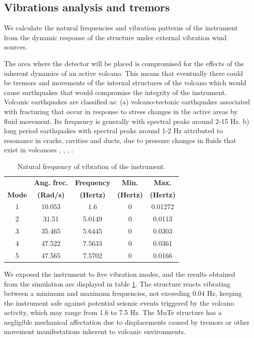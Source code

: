 \documentclass[letterpaper,11pt]{article}
\begin{document}
\subsection{Vibrations analysis and tremors}
We calculate the natural frequencies and vibration patterns of the instrument from the dynamic response of the structure under external vibration wind sources. 

The area where the detector will be placed is compromised for the effects of the inherent dynamics of an active volcano. This means that eventually there could be tremors and movements of the internal structures of the volcano which would cause earthquakes that would compromise the integrity of the instrument. Volcanic earthquakes are classified as: (a) volcano-tectonic earthquakes associated with fracturing that occur in response to stress changes in the active areas by fluid movement. Its frequency is generally with spectral peaks around 2-15 Hz. b) long period earthquakes with spectral peaks around 1-2 Hz attributed to resonance in cracks, cavities and ducts, due to pressure changes in fluids that exist in volcanoes \cite{mcnutt1992volcanic}, \cite{londono2001spectral}, \cite{langer2006automatic}, \cite{chouet2003volcano}.

\begin{table}[htb]
\begin{center}
\begin{tabular}{ccccc}
\hline
& {\bf Ang. frec.} & {\bf Frequency} & {\bf Min.}  & {\bf Max.}\\
{\bf Mode} & {\bf (Rad/s)} & {\bf (Hertz)} & {\bf (Hertz)} & {\bf (Hertz)} \\
\hline
1 & 10.053 & 1.6 & 0 & 0.01272\\ 
2 & 31.51 & 5.0149  & 0 & 0.0113 \\
3 & 35.465 & 5.6445  & 0 & 0.0303 \\
4 & 47.522 & 7.5633  & 0 & 0.0361 \\
5 & 47.565 & 7.5702 & 0 & 0.0166 \\
\hline
\end{tabular}
\end{center}
\caption{Natural frequency of vibration of the instrument.}
\label{Table_nat_frec1}
\end{table}

We exposed the instrument to five vibration modes, and the results obtained from the simulation are displayed in table \ref{Table_nat_frec1}. The structure reacts vibrating between a minimum and maximum frequencies, not exceeding $0.04$ Hz, keeping the instrument safe against potential seismic events triggered by the volcano activity, which may range from 1.6 to 7.5 Hz. The MuTe structure has a negligible mechanical affectation due to displacements caused by tremors or other movement manifestations inherent to volcanic environments.
\end{document}
